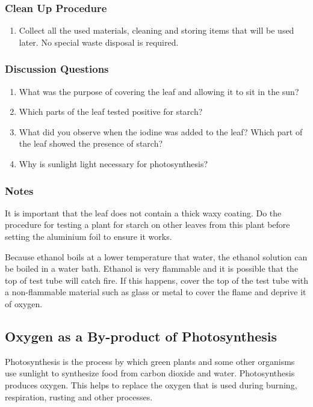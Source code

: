 \subsubsection*{Clean Up Procedure}
\begin{enumerate}
\item{Collect all the used materials, cleaning and storing items that will be used later. No special waste disposal is required.}
\end{enumerate}

\subsubsection*{Discussion Questions}
\begin{enumerate}
\item{What was the purpose of covering the leaf and allowing it to sit in the sun?}
\item{Which parts of the leaf tested positive for starch?}
\item{What did you observe when the iodine was added to the leaf? Which part of the leaf showed the presence of starch?}
\item{Why is sunlight light necessary for photosynthesis?}
\end{enumerate}

\subsubsection*{Notes}
It is important that the leaf does not contain a thick waxy coating. Do the procedure for testing a plant for starch on other leaves from this plant before setting the aluminium foil to ensure it works.

Because ethanol boils at a lower temperature that water, the ethanol solution can be boiled in a water bath. Ethanol is very flammable and it is possible that the top of test tube will catch fire. If this happens, cover the top of the test tube with a non-flammable material such as glass or metal to cover the flame and deprive it of oxygen.

\subsection{Oxygen as a By-product of Photosynthesis}

Photosynthesis is the process by which green plants and some other organisms use sunlight to synthesize food from carbon dioxide and water. Photosynthesis produces oxygen. This helps to replace the oxygen that is used during burning, respiration, rusting and other processes.

